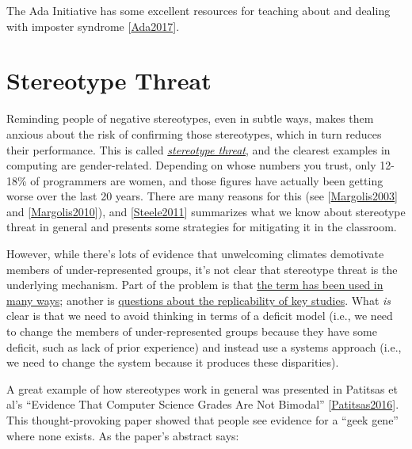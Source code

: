 \documentclass[10pt,statementpaper]{memoir}
\begin{document}
The Ada Initiative has some excellent resources for teaching about and
dealing with imposter syndrome
{[}\href{biblio.html\#ada-imposter}{Ada2017}{]}.

\section{Stereotype Threat}\label{stereotype-threat}

Reminding people of negative stereotypes, even in subtle ways, makes
them anxious about the risk of confirming those stereotypes, which in
turn reduces their performance. This is called
\emph{\href{gloss.html\#stereotype-threat}{stereotype threat}}, and the
clearest examples in computing are gender-related. Depending on whose
numbers you trust, only 12-18\% of programmers are women, and those
figures have actually been getting worse over the last 20 years. There
are many reasons for this (see
{[}\href{biblio.html\#margolis-fisher-clubhouse}{Margolis2003}{]} and
{[}\href{biblio.html\#margolis-shallow}{Margolis2010}{]}), and
{[}\href{biblio.html\#steele-vivaldi}{Steele2011}{]} summarizes what we
know about stereotype threat in general and presents some strategies for
mitigating it in the classroom.

However, while there's lots of evidence that unwelcoming climates
demotivate members of under-represented groups, it's not clear that
stereotype threat is the underlying mechanism. Part of the problem is
that
\href{http://www.europhd.net/html/_onda02/07/PDF/20th_lab_materials/jane/shapiro_neuberg_2007.pdf}{the
term has been used in many ways}; another is
\href{https://www.psychologytoday.com/blog/rabble-rouser/201512/is-stereotype-threat-overcooked-overstated-and-oversold}{questions
about the replicability of key studies}. What \emph{is} clear is that we
need to avoid thinking in terms of a deficit model (i.e., we need to
change the members of under-represented groups because they have some
deficit, such as lack of prior experience) and instead use a systems
approach (i.e., we need to change the system because it produces these
disparities).

A great example of how stereotypes work in general was presented in
Patitsas et al's ``Evidence That Computer Science Grades Are Not
Bimodal'' {[}\href{biblio.html\#patitsas-cs-grades}{Patitsas2016}{]}.
This thought-provoking paper showed that people see evidence for a
``geek gene'' where none exists. As the paper's abstract says:
\end{document}
